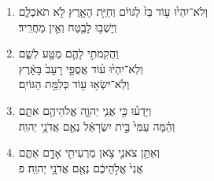 \documentclass[12pt,a4paper,titlepage]{article}
\def \pslabelsep{-0.9em} %
\def \psleftmargin{0em} %
\begin{document}
\begin{enumerate}[leftmargin=\psleftmargin, labelsep = \pslabelsep, label={\arabic*}, font=\color{\pscolor}\small\textsuperscript, parsep=0em, itemsep=0em, topsep=0em ]
\item \texthebrew{וְלֹא־יִהְי֙וּ ע֥וֹד בַּז֙ לַגּוֹיִ֔ם וְחַיַּ֥ת הָאָ֖רֶץ לֹ֣א תֹאכְלֵ֑ם \\ וְיָשְׁב֥וּ לָבֶ֖טַח וְאֵ֥ין מַחֲרִֽיד׃}
\item \texthebrew{וַהֲקִמֹתִ֥י לָהֶ֛ם מַטָּ֖ע לְשֵׁ֑ם \\ וְלֹֽא־יִהְי֙וּ ע֜וֹד אֲסֻפֵ֤י רָעָב֙ בָּאָ֔רֶץ \\ וְלֹֽא־יִשְׂא֥וּ ע֖וֹד כְּלִמַּ֥ת הַגּוֹיִֽם׃}
\item \texthebrew{וְיָדְע֗וּ כִּ֣י אֲנִ֧י יְהוָ֛ה אֱלֹהֵיהֶ֖ם אִתָּ֑ם \\ וְהֵ֗מָּה עַמִּי֙ בֵּ֣ית יִשְׂרָאֵ֔ל נְאֻ֖ם אֲדֹנָ֥י יְהוִֽה׃}
\item \texthebrew{וְאַתֵּ֥ן צֹאנִ֛י צֹ֥אן מַרְעִיתִ֖י אָדָ֣ם אַתֶּ֑ם \\ אֲנִי֙ אֱלֹ֣הֵיכֶ֔ם נְאֻ֖ם אֲדֹנָ֥י יְהוִֽה׃ פ}
\end{enumerate}
\newpage

\end{document}
